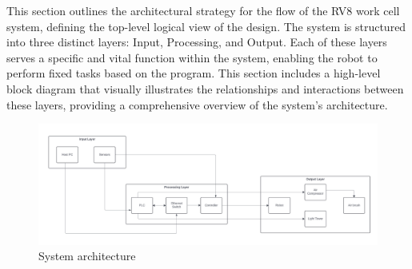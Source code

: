 This section outlines the architectural strategy for the flow of the RV8 work cell system, defining the top-level logical view of the design. The system is structured into three distinct layers: Input, Processing, and Output. Each of these layers serves a specific and vital function within the system, enabling the robot to perform fixed tasks based on the program. This section includes a high-level block diagram that visually illustrates the relationships and interactions between these layers, providing a comprehensive overview of the system's architecture.  

\begin{figure}[h!]
	\centering
 	\includegraphics[width=1\textwidth]{images/System_sub.png}
 \caption{System architecture}
\end{figure}
